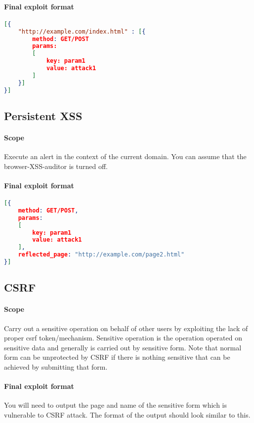 \documentclass{article}[10pt]
\begin{document}
\paragraph{Final exploit format\\}
\begin{lstlisting}[language=json,firstnumber=1]
[{
	"http://example.com/index.html" : [{
		method: GET/POST
		params: 
		[
			key: param1
			value: attack1
		]
	}]
}]
\end{lstlisting}

\subsection{Persistent XSS}
\paragraph{Scope} Execute an alert in the context of the current domain. You can assume that the browser-XSS-auditor is turned off.

\paragraph{Final exploit format\\}

\begin{lstlisting}[language=json,firstnumber=1]
[{
	method: GET/POST,
	params: 
	[
		key: param1
		value: attack1
	],
	reflected_page: "http://example.com/page2.html"
}]
\end{lstlisting}

\subsection{CSRF} 
\paragraph{Scope} Carry out a sensitive operation on behalf of other users by exploiting the lack of proper csrf token/mechanism. Sensitive operation is the operation operated on sensitive data and generally is carried out by sensitive form. Note that normal form can be unprotected by CSRF if there is nothing sensitive that can be achieved by submitting that form.


\paragraph{Final exploit format} You will need to output the page and name of the sensitive form which is vulnerable to CSRF attack. The format of the output should look similar to this.
\end{document}
